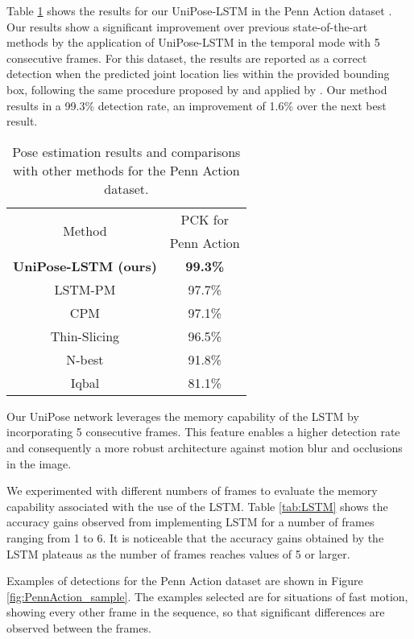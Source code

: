 \documentclass[10pt,twocolumn,letterpaper]{article}
\begin{document}
Table \ref{tab:PennAction} shows the results for our UniPose-LSTM in the Penn Action dataset \cite{PennAction}. Our results show a significant improvement over previous state-of-the-art methods by the application of UniPose-LSTM in the temporal mode with 5 consecutive frames. 
For this dataset, the results are reported as a correct detection when the predicted joint location lies within the provided bounding box, following the same procedure proposed by \cite{Articulated} and applied by \cite{LSTM-PM}.
Our method results in a 99.3\% detection rate, an improvement of 1.6\% over the next best result.

\begin{table}[!ht]
\begin{center}
\begin{tabular}{|c|c|}
\hline
    \multirow{2}{*}{Method}&PCK for\\
    &Penn Action\\
\hline\hline
    \textbf{UniPose-LSTM (ours)}&\textbf{99.3\%}\\
    LSTM-PM \cite{LSTM-PM} & 97.7\%\\
    CPM \cite{CPM} & 97.1\%\\
    Thin-Slicing \cite{Thin-Slicing} & 96.5\%\\
    N-best \cite{N-best} & 91.8\%\\
    Iqbal \cite{Iqbal} & 81.1\%\\
\hline
\end{tabular}
\end{center}
\caption{Pose estimation results and comparisons with other methods for the Penn Action dataset.}
\label{tab:PennAction}
\end{table}
Our UniPose network leverages  the memory capability of the LSTM by incorporating 5 consecutive frames. This feature enables a higher detection rate and consequently a more robust architecture against motion blur and occlusions in the image.

We experimented with different numbers of frames to evaluate the memory capability associated with the use of the LSTM. Table \ref{tab:LSTM} shows the accuracy gains observed from implementing LSTM for a number of frames ranging from 1 to 6. It is noticeable that the accuracy gains obtained by the LSTM plateaus as the number of frames reaches values of 5 or larger.

Examples of detections for the Penn Action dataset \cite{PennAction} are shown in Figure \ref{fig:PennAction_sample}. The examples selected are for situations of fast motion, showing every other frame in the sequence, so that significant differences are observed between the frames.
\end{document}
